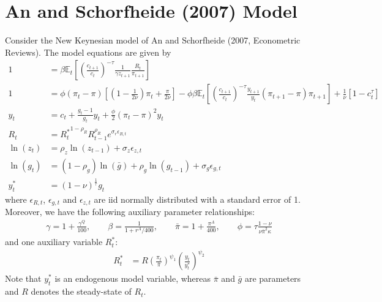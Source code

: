 \documentclass{article}
\begin{document}
\section[An and Schorfheide (2007) Model]{An and Schorfheide (2007) Model\label{ex:AnScho}}
Consider the New Keynesian model of An and Schorfheide (2007, Econometric Reviews).
The model equations are given by 
\begin{align}
1 &= \beta \mathbb{E}_t\left[{\left(\frac{c_{t+1}}{c_t}\right)}^{-\tau} \frac{1}{\gamma z_{t+1}} \frac{R_t}{\pi_{t+1}}\right] \label{eq:AS_B1}
\\
1 &= \phi \left(\pi_t - \pi\right) \left[\left(1-\frac{1}{2\nu}\right)\pi_t + \frac{\pi}{2\nu}\right] - \phi \beta \mathbb{E}_t \left[{\left(\frac{c_{t+1}}{c_t}\right)}^{-\tau} \frac{y_{t+1}}{y_t} \left(\pi_{t+1} - \pi \right) \pi_{t+1}\right] + \frac{1}{\nu}\left[1-c_t^{\tau}\right]
\\
y_t &= c_t + \frac{g_t-1}{g_t} y_t + \frac{\phi}{2} {\left({\pi_t - \pi}\right)}^2 y_t
\\
R_t &= {R_t^{*}}^{1-\rho_R} R_{t-1}^{\rho_R} e^{\sigma_r\epsilon_{R,t}}
\\
\ln(z_t) &= \rho_z \ln(z_{t-1}) + \sigma_z\epsilon_{z,t}
\\
\ln(g_t) &= (1-\rho_g)\ln(\bar{g}) + \rho_g \ln(g_{t-1}) + \sigma_g\epsilon_{g,t}
\\
y_t^* &= {(1-\nu)}^{\frac{1}{\tau}} g_t
\end{align}
where \(\epsilon_{R,t}\), \(\epsilon_{g,t}\) and \(\epsilon_{z,t}\) are iid normally distributed with a standard error of 1.
Moreover, we have the following auxiliary parameter relationships:
\begin{align*}
\gamma = 1+\frac{\gamma^{Q}}{100}, \qquad
\beta = \frac{1}{1+r^{A}/400}, \qquad
\bar{\pi} = 1+\frac{\pi^{A}}{400}, \qquad
\phi = \tau \frac{1-\nu}{\nu \bar{\pi}^{2}\kappa}
\end{align*}
and one auxiliary variable \(R_t^*\):
\begin{align*}
R_t^* &= R {\left(\frac{\pi_t}{\bar{\pi}}\right)}^{\psi_1} {\left(\frac{y_t}{y_t^*}\right)}^{\psi_2}
\end{align*}
Note that \(y_t^*\) is an endogenous model variable, whereas \(\bar{\pi}\) and \(\bar{g}\) are parameters and \(R\) denotes the steady-state of \(R_t\).
\end{document}
